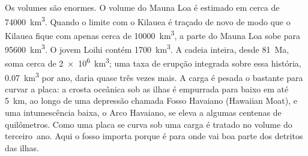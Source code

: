 Os volumes são enormes. O volume do Mauna Loa é estimado em cerca de \qty{74000}{km^3}. Quando o limite com o Kilauea é traçado de novo de modo que o Kilauea fique com apenas cerca de
\qty{10000}{km^3}, a parte do Mauna Loa sobe para \qty{95600}{km^3}. O jovem Loihi contém
\qty{1700}{km^3}. A cadeia inteira, desde \qty{81}{Ma}, soma cerca de
\qty{2e6}{km^3}; uma taxa de erupção integrada sobre essa história, \qty{0.07}{km^3} por ano, daria quase três vezes mais. A carga é pesada o bastante para curvar a
placa: a crosta oceânica sob as ilhas é empurrada para baixo em até \qty{5}{km}, ao longo de uma
depressão chamada Fosso Havaiano (Hawaiian Moat), e uma intumescência baixa, o Arco Havaiano, se eleva a algumas centenas de
quilômetros. Como uma placa se curva sob uma carga é tratado no volume do terceiro~ano. Aqui o fosso
importa porque é para onde vai boa parte dos detritos das ilhas.

